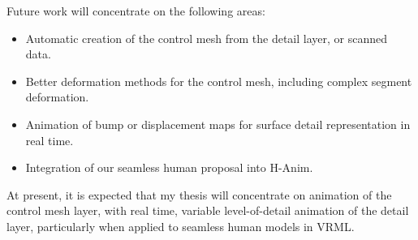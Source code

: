 \documentclass[10pt,oneside,fleqn,a4paper]{book}
\begin{document}
Future work will concentrate on the following areas:

\begin{itemize}
\item Automatic creation of the control mesh from the detail layer, or scanned data.
\item Better deformation methods for the control mesh, including complex segment deformation.
\item Animation of bump or displacement maps for surface detail representation in real time.
\item Integration of our seamless human proposal into H-Anim.
\end{itemize}

At present, it is expected that my thesis will concentrate on animation of the control mesh layer, with real time, variable level-of-detail animation of the detail layer, particularly when applied to seamless human models in VRML.




\end{document}
